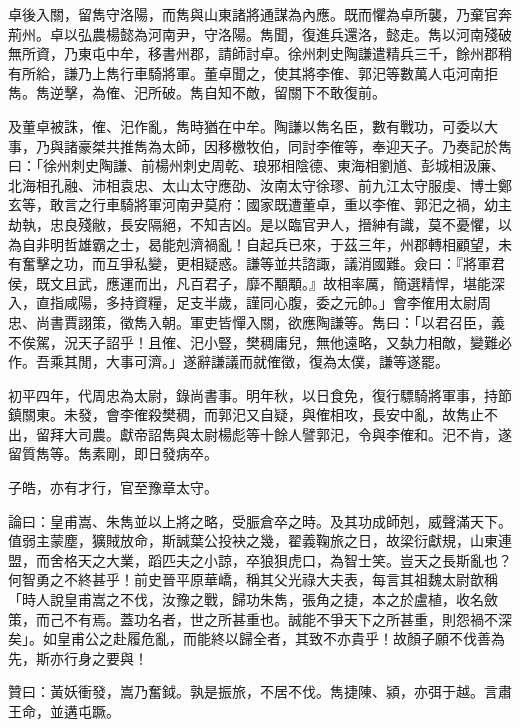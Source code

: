 \begin{pinyinscope}
卓後入關，留雋守洛陽，而雋與山東諸將通謀為內應。既而懼為卓所襲，乃棄官奔荊州。卓以弘農楊懿為河南尹，守洛陽。雋聞，復進兵還洛，懿走。雋以河南殘破無所資，乃東屯中牟，移書州郡，請師討卓。徐州刺史陶謙遣精兵三千，餘州郡稍有所給，謙乃上雋行車騎將軍。董卓聞之，使其將李傕、郭汜等數萬人屯河南拒雋。雋逆擊，為傕、汜所破。雋自知不敵，留關下不敢復前。

及董卓被誅，傕、汜作亂，雋時猶在中牟。陶謙以雋名臣，數有戰功，可委以大事，乃與諸豪桀共推雋為太師，因移檄牧伯，同討李傕等，奉迎天子。乃奏記於雋曰：「徐州刺史陶謙、前楊州刺史周乾、琅邪相陰德、東海相劉馗、彭城相汲廉、北海相孔融、沛相袁忠、太山太守應劭、汝南太守徐璆、前九江太守服虔、博士鄭玄等，敢言之行車騎將軍河南尹莫府：國家既遭董卓，重以李傕、郭汜之禍，幼主劫執，忠良殘敝，長安隔絕，不知吉凶。是以臨官尹人，搢紳有識，莫不憂懼，以為自非明哲雄霸之士，曷能剋濟禍亂！自起兵已來，于茲三年，州郡轉相顧望，未有奮擊之功，而互爭私變，更相疑惑。謙等並共諮諏，議消國難。僉曰：『將軍君侯，既文且武，應運而出，凡百君子，靡不顒顒。』故相率厲，簡選精悍，堪能深入，直指咸陽，多持資糧，足支半歲，謹同心腹，委之元帥。」會李傕用太尉周忠、尚書賈詡策，徵雋入朝。軍吏皆憚入關，欲應陶謙等。雋曰：「以君召臣，義不俟駕，況天子詔乎！且傕、汜小豎，樊稠庸兒，無他遠略，又埶力相敵，變難必作。吾乘其閒，大事可濟。」遂辭謙議而就傕徵，復為太僕，謙等遂罷。

初平四年，代周忠為太尉，錄尚書事。明年秋，以日食免，復行驃騎將軍事，持節鎮關東。未發，會李傕殺樊稠，而郭汜又自疑，與傕相攻，長安中亂，故雋止不出，留拜大司農。獻帝詔雋與太尉楊彪等十餘人譬郭汜，令與李傕和。汜不肯，遂留質雋等。雋素剛，即日發病卒。

子皓，亦有才行，官至豫章太守。

論曰：皇甫嵩、朱雋並以上將之略，受脤倉卒之時。及其功成師剋，威聲滿天下。值弱主蒙塵，獷賊放命，斯誠葉公投袂之幾，翟義鞠旅之日，故梁衍獻規，山東連盟，而舍格天之大業，蹈匹夫之小諒，卒狼狽虎口，為智士笑。豈天之長斯亂也？何智勇之不終甚乎！前史晉平原華嶠，稱其父光祿大夫表，每言其祖魏太尉歆稱「時人說皇甫嵩之不伐，汝豫之戰，歸功朱雋，張角之捷，本之於盧植，收名斂策，而己不有焉。蓋功名者，世之所甚重也。誠能不爭天下之所甚重，則怨禍不深矣」。如皇甫公之赴履危亂，而能終以歸全者，其致不亦貴乎！故顏子願不伐善為先，斯亦行身之要與！

贊曰：黃妖衝發，嵩乃奮鉞。孰是振旅，不居不伐。雋捷陳、潁，亦弭于越。言肅王命，並遘屯蹶。


\end{pinyinscope}
